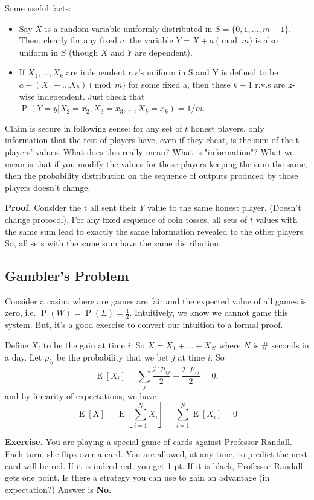 \documentclass[14pt]{extreport}
\newcommand{\E}[1]{\operatorname{E}\left[#1\right]}
\renewcommand{\Pr}[1]{\operatorname{P}\left(#1\right)}
\begin{document}
    Some useful facts:
    \begin{itemize}
        \item Say $X$ is a random variable uniformly distributed in $S = \{0, 1, \dots, m-1\}$.  Then, clearly for any fixed $a$, the variable $Y = X + a \pmod{m}$ is also uniform in $S$ (though $X$ and $Y$ are dependent).
        \item If $X_1, \dots, X_k$ are independent r.v's uniform in S and Y is defined to be $a - (X_1 + ... X_k) \pmod{m}$ for some fixed a, then these $k+1$ r.v.s are k-wise independent. Just check that $\Pr{Y = y | X_2 = x_2, X_3 = x_3, ..., X_k = x_k} = 1/m$.
    \end{itemize}
    Claim is secure in following sense: for any set of $t$ honest players, only information that the rest of players have, even if they cheat, is the sum of the t players' values.  What does this really mean?  What is "information"?  What we mean is that if you modify the values for these players keeping the sum the same, then the probability distribution on the sequence of outputs produced by those players doesn't change.  
    
    
    \vspace{5mm}
    \textbf{Proof.} Consider the t all sent their $Y$ value to the same honest player.  (Doesn't change protocol).  For any fixed sequence of coin tosses, all sets of $t$ values with the same sum lead to exactly the same information revealed to the other players.  So, all sets with the same sum have the same distribution.


\subsection*{Gambler's Problem}
    Consider a casino where are games are fair and the expected value of all games is zero, i.e. $\Pr{W} = \Pr{L} = \frac{1}{2}$. Intuitively, we know we cannot game this system. But, it's a good exercise to convert our intuition to a formal proof.

    \vspace{2mm}
    Define $X_{i}$ to be the gain at time $i$. So $X = X_{1} + \dots + X_{N}$ where $N$ is \# seconds in a day. Let $p_{ij}$ be the probability that we bet $j$ at time $i$. So $$\E{X_{i}} = \sum_{j} \frac{j \cdot p_{ij}}{2} - \frac{j \cdot p_{ij}}{2} = 0,$$ and by linearity of expectations, we have $$\E{X} = \E{\sum_{i = 1}^{N} X_{i}} = \sum_{i = 1}^{N}\E{X_{i}} = 0$$

    \textbf{Exercise. } You are playing a special game of cards against Professor Randall. Each turn, she flips over a card. You are allowed, at any time, to predict the next card will be red. If it is indeed red, you get 1 pt. If it is black, Professor Randall gets one point. Is there a strategy you can use to gain an advantage (in expectation?) Answer is \textbf{No.}
    
\end{document}
